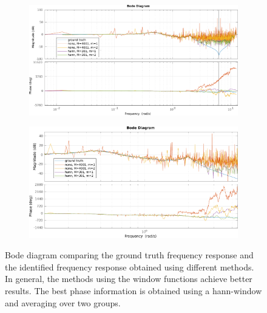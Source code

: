 \documentclass{scrartcl}
\newcommand*{\matlabcode}[3]{\begin{figure}[h!]\end{figure}}
\begin{document}
\begin{figure}[h]
	\centering
	\begin{subfigure}{\textwidth}
		\includegraphics[width=\textwidth]{figures/bode_1_6_large.pdf}
	\end{subfigure}
	\begin{subfigure}{\textwidth}
		\includegraphics[width=\textwidth]{figures/bode_1_6.pdf}
	\end{subfigure}
	\caption{Bode diagram comparing the ground truth frequency response and the identified frequency response obtained using different methods. In general, the methods using the window functions achieve better results. The best phase information is obtained using a hann-window and averaging over two groups.}
	\label{fig:bode_final}
\end{figure}

\matlabcode{../matlab/ce1/spectral_analysis.m}
{{Compute the frequency response of the system to be identified using the spectral analysis method. The function interface provides additional parameters for specifiying the (optional) window and the corresponding window-width. If no window parameters are given, no window is used.}}
{lst:resp_spec_ana}
\end{document}

